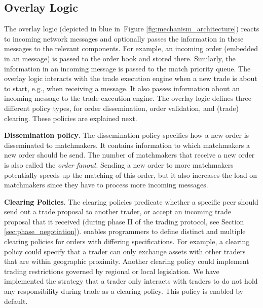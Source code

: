 \subsection{Overlay Logic}
\label{subsec:overlay_logic}
The \ModelName{} overlay logic (depicted in blue in~Figure \ref{fig:mechanism_architecture}) reacts to incoming network messages and optionally passes the information in these messages to the relevant components.
For example, an incoming order (embedded in an \MsgOrder{} message) is passed to the order book and stored there.
Similarly, the information in an incoming \MsgMatch{} message is passed to the match priority queue.
The overlay logic interacts with the trade execution engine when a new trade is about to start, e.g., when receiving a \MsgTrdAccept{} message.
It also passes information about an incoming \MsgPayment{} message to the trade execution engine.
The overlay logic defines three different policy types, for order dissemination, order validation, and (trade) clearing.
These policies are explained next.

\textbf{Dissemination policy}.
The dissemination policy specifies how a new order is disseminated to matchmakers.
It contains information to which matchmakers a new order should be send.
The number of matchmakers that receive a new order is also called the \emph{order fanout}.
Sending a new order to more matchmakers potentially speeds up the matching of this order, but it also increases the load on matchmakers since they have to process more incoming \MsgOrder{} messages.

\textbf{Clearing Policies}.
The clearing policies predicate whether a specific peer should send out a trade proposal to another trader, or accept an incoming trade proposal that it received (during phase II of the \ModelName{} trading protocol, see Section \ref{sec:phase_negotiation}).
\ModelName{} enables programmers to define distinct and multiple clearing policies for orders with differing specifications.
For example, a clearing policy could specify that a trader can only exchange assets with other traders that are within geographic proximity.
Another clearing policy could implement trading restrictions governed by regional or local legislation.
We have implemented the strategy that a trader only interacts with traders to do not hold any responsibility during trade as a clearing policy.
This policy is enabled by default.

